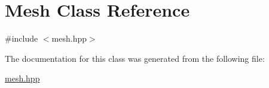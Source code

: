 \hypertarget{class_mesh}{\section{Mesh Class Reference}
\label{class_mesh}
}


{\ttfamily \#include $<$mesh.\-hpp$>$}



The documentation for this class was generated from the following file\-:\begin{DoxyCompactItemize}
\item 
\hyperlink{mesh_8hpp}{mesh.\-hpp}\end{DoxyCompactItemize}
